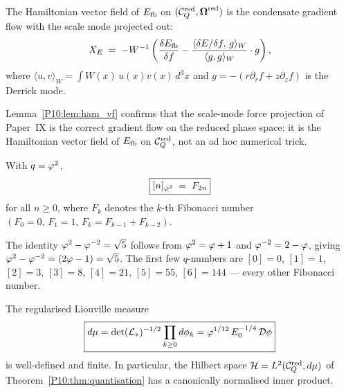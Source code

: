 \begin{lemma}
\label{P10:lem:ham_vf}
The Hamiltonian vector field of $E_{\mathrm{fb}}$ on $(\mathcal{C}_Q^{\mathrm{red}},\boldsymbol{\Omega}^{\mathrm{red}})$
is the condensate gradient flow with the scale mode projected out:
\begin{equation}
  X_E \;=\; -W^{-1}\left(\frac{\delta E_{\mathrm{fb}}}{\delta f}
  - \frac{\langle\delta E/\delta f,\,g\rangle_W}
         {\langle g,g\rangle_W}\cdot g\right),
  \label{P10:eq:ham_vf}
\end{equation}
where $\langle u,v\rangle_W = \int W(x)\,u(x)v(x)\,d^3x$
and $g = -(r\partial_r f + z\partial_z f)$ is the Derrick mode.
\end{lemma}

\begin{remark}
\label{P10:rem:ham_vf_confirms}
Lemma~\ref{P10:lem:ham_vf} confirms that the scale-mode force projection
of Paper~IX is the correct gradient flow on the reduced phase space:
it is the Hamiltonian vector field of $E_{\mathrm{fb}}$ on $\mathcal{C}_Q^{\mathrm{red}}$,
not an ad hoc numerical trick.
\end{remark}

\begin{lemma}
\label{P10:lem:fibonacci}
With $q = \varphi^2$,
\begin{equation}
  \boxed{[n]_{\varphi^2} \;=\; F_{2n}}
  \label{P10:eq:fibonacci}
\end{equation}
for all $n\geq0$, where $F_k$ denotes the $k$-th Fibonacci number
$(F_0=0,\,F_1=1,\,F_k = F_{k-1}+F_{k-2})$.
\end{lemma}

\begin{remark}
\label{P10:rem:qnumber_identity}
The identity $\varphi^2 - \varphi^{-2} = \sqrt{5}$ follows from
$\varphi^2 = \varphi+1$ and $\varphi^{-2} = 2-\varphi$, giving
$\varphi^2-\varphi^{-2} = (2\varphi-1) = \sqrt{5}$.
The first few $q$-numbers are $[0]=0$, $[1]=1$, $[2]=3$, $[3]=8$,
$[4]=21$, $[5]=55$, $[6]=144$ --- every other Fibonacci number.
\end{remark}

\begin{corollary}
\label{P10:cor:measure_welldefined}
The regularised Liouville measure
\begin{equation}
  \boxed{d\mu = \det(\mathcal{L}_*)^{-1/2}\prod_{k\geq0}d\phi_k
  = \varphi^{1/12}\,E_0^{-1/4}\,\mathcal{D}\phi}
  \label{P10:eq:measure_normalised}
\end{equation}
is well-defined and finite.
In particular, the Hilbert space $\mathcal{H} = L^2(\mathcal{C}_Q^{\mathrm{red}},d\mu)$ of
Theorem~\ref{P10:thm:quantisation} has a canonically normalised
inner product.
\end{corollary}


